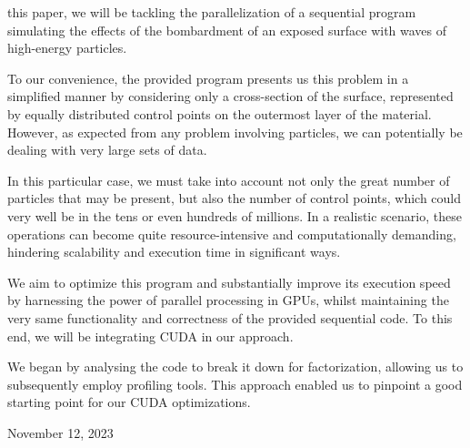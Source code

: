\documentclass[10pt,journal,compsoc]{IEEEtran}
\begin{document}
% 
% 
% 
% 
 this paper, we will be tackling the parallelization of a sequential program simulating the effects of the bombardment of an exposed surface with waves of high-energy particles. \par
To our convenience, the provided program presents us this problem in a simplified manner by considering only a cross-section of the surface, represented by equally distributed control points on the outermost layer of the material. However, as expected from any problem involving particles, we can potentially be dealing with very large sets of data. \par
In this particular case, we must take into account not only the great number of particles that may be present, but also the number of control points, which could very well be in the tens or even hundreds of millions. In a realistic scenario, these operations can become quite resource-intensive and computationally demanding, hindering scalability and execution time in significant ways. \par
We aim to optimize this program and substantially improve its execution speed by harnessing the power of parallel processing in GPUs, whilst maintaining the very same functionality and correctness of the provided sequential code. To this end, we will be integrating CUDA in our approach. \par
We began by analysing the code to break it down for factorization, allowing us to subsequently employ profiling tools. This approach enabled us to pinpoint a good starting point for our CUDA optimizations.



 
\hfill November 12, 2023

\end{document}
